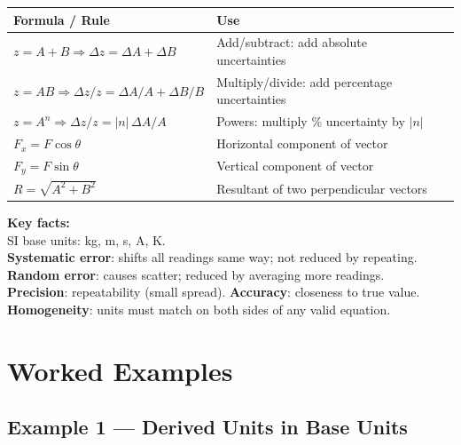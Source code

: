 \begin{minipage}{\linewidth}
\begin{tcolorbox}[colback=lightgold, colframe=accentgold]
\renewcommand{\arraystretch}{1.8}
\begin{tabular}{@{}lll@{}}
\toprule
\textbf{Formula / Rule} & \textbf{Use} & \\
\midrule
$z = A + B \Rightarrow \Delta z = \Delta A + \Delta B$ & Add/subtract: add absolute uncertainties & \\
$z = AB \Rightarrow \Delta z/z = \Delta A/A + \Delta B/B$ & Multiply/divide: add percentage uncertainties & \\
$z = A^n \Rightarrow \Delta z/z = |n|\,\Delta A/A$ & Powers: multiply \% uncertainty by $|n|$ & \\
$F_x = F\cos\theta$ & Horizontal component of vector & \\
$F_y = F\sin\theta$ & Vertical component of vector & \\
$R = \sqrt{A^2+B^2}$ & Resultant of two perpendicular vectors & \\
\bottomrule
\end{tabular}
\end{tcolorbox}

\vspace{0.5em}
\begin{tcolorbox}[colback=lightblue, colframe=darkblue]
\textbf{Key facts:}\\[0.3em]
SI base units: kg, m, s, A, K.\\[0.2em]
\textbf{Systematic error}: shifts all readings same way; not reduced by repeating.\\[0.2em]
\textbf{Random error}: causes scatter; reduced by averaging more readings.\\[0.2em]
\textbf{Precision}: repeatability (small spread). \textbf{Accuracy}: closeness to true value.\\[0.2em]
\textbf{Homogeneity}: units must match on both sides of any valid equation.
\end{tcolorbox}
\end{minipage}

\pagebreak

\section{Worked Examples}

\subsection*{Example 1 --- Derived Units in Base Units}

